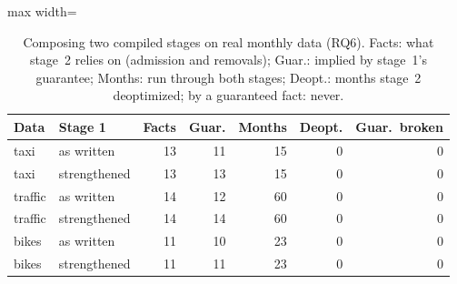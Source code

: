 \begin{table}[t]
\caption{Composing two compiled stages on real monthly data (RQ6). Facts: what stage~2 relies on (admission and removals); Guar.: implied by stage~1's guarantee; Months: run through both stages; Deopt.: months stage~2 deoptimized; by a guaranteed fact: never.}
\label{tab:rq-compose}
\centering
\footnotesize
\begin{adjustbox}{max width=\linewidth}
\begin{tabular}{@{}llrrrrr@{}}
\toprule
Data & Stage 1 & Facts & Guar. & Months & Deopt. & Guar.\ broken \\
\midrule
taxi & as written & 13 & 11 & 15 & 0 & 0 \\
taxi & strengthened & 13 & 13 & 15 & 0 & 0 \\
traffic & as written & 14 & 12 & 60 & 0 & 0 \\
traffic & strengthened & 14 & 14 & 60 & 0 & 0 \\
bikes & as written & 11 & 10 & 23 & 0 & 0 \\
bikes & strengthened & 11 & 11 & 23 & 0 & 0 \\
\bottomrule
\end{tabular}
\end{adjustbox}
\end{table}
